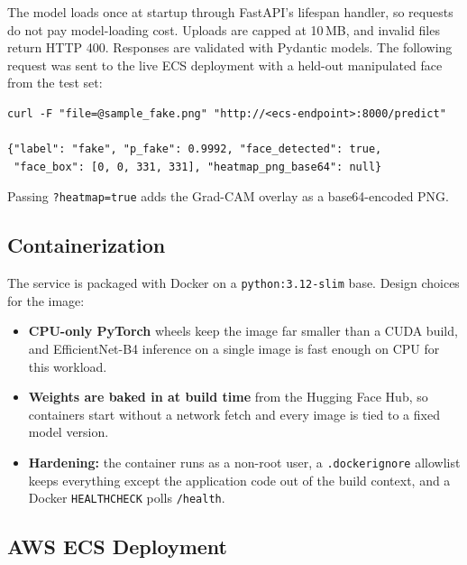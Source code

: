 \documentclass[11pt]{article}
\begin{document}
\noindent The model loads once at startup through FastAPI's lifespan handler, so requests do not pay model-loading cost. Uploads are capped at 10\,MB, and invalid files return HTTP 400. Responses are validated with Pydantic models. The following request was sent to the live ECS deployment with a held-out manipulated face from the test set:

\begin{lstlisting}
curl -F "file=@sample_fake.png" "http://<ecs-endpoint>:8000/predict"

{"label": "fake", "p_fake": 0.9992, "face_detected": true,
 "face_box": [0, 0, 331, 331], "heatmap_png_base64": null}
\end{lstlisting}
Passing \texttt{?heatmap=true} adds the Grad-CAM overlay as a base64-encoded PNG.

\subsection{Containerization}

The service is packaged with Docker on a \texttt{python:3.12-slim} base. Design choices for the image:
\begin{itemize}
  \item \textbf{CPU-only PyTorch} wheels keep the image far smaller than a CUDA build, and EfficientNet-B4 inference on a single image is fast enough on CPU for this workload.
  \item \textbf{Weights are baked in at build time} from the Hugging Face Hub, so containers start without a network fetch and every image is tied to a fixed model version.
  \item \textbf{Hardening:} the container runs as a non-root user, a \texttt{.dockerignore} allowlist keeps everything except the application code out of the build context, and a Docker \texttt{HEALTHCHECK} polls \texttt{/health}.
\end{itemize}

\subsection{AWS ECS Deployment}
\end{document}

